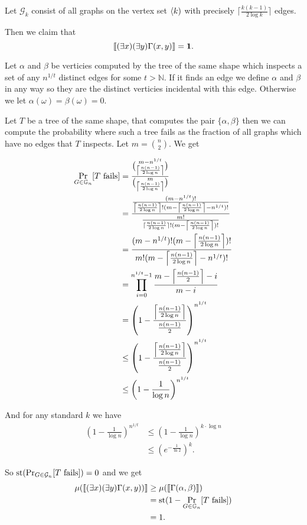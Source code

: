 \begin{exam}
Let $\mathcal{G}_k$ consist of all graphs on the vertex set $\langle k)$ with precisely $\lceil\frac{k(k-1)}{2\log k}\rceil$ edges.

Then we claim that
\[\llbracket(\exists x)(\exists y)\Gamma(x,y)\rrbracket=\textbf{1}.\]

Let $\alpha$ and $\beta$ be verticies computed by the tree of the same shape which inspects a set of any $n^{1/t}$ distinct edges for some $t>\mathbb{N}$. If it finds an edge we define $\alpha$ and $\beta$ in any way so they are the distinct verticies incidental with this edge. Otherwise we let $\alpha(\omega)=\beta(\omega)=0$.

Let $T$ be a tree of the same shape, that computes the pair $\{\alpha,\beta\}$ then we can compute the probability where such a tree fails as the fraction of all graphs which have no edges that $T$ inspects. Let $m=\binom{n}{2}$. We get

\begin{align}
\Pr_{G\in\mathbb{G}_n}[T\text{ fails}]&=\frac{\binom{m-n^{1/t}}{\left \lceil { \frac{n(n-1)}{2\log n}} \right \rceil }}{\binom{m}{\left \lceil { \frac{n(n-1)}{2\log n}} \right \rceil}}\\
&=\frac{\frac{(m-n^{1/t})!}{\left \lceil {\frac{n(n-1)}{2\log n}} \right \rceil ! (m-\left \lceil { \frac{n(n-1)}{2\log n}} \right \rceil-n^{1/t})!}}{\frac{m!}{\lceil \frac{n(n-1)}{2\log n}\rceil!(m-\left \lceil {\frac{n(n-1)}{2\log n}} \right \rceil)!}}\\
&=\frac{(m-n^{1/t})!(m-\left \lceil { \frac{n(n-1)}{2\log n}} \right \rceil)!}{m!(m-\left \lceil {\frac{n(n-1)}{2\log n}} \right \rceil-n^{1/t})!}\\
&=\prod_{i=0}^{n^{1/t}-1}\frac{m-\left \lceil {\frac{n(n-1)}{2}} \right \rceil-i}{m-i}\\
&=\left(1-\frac{\left \lceil {\frac{n(n-1)}{2\log n}} \right \rceil}{\frac{n(n-1)}{2}}\right)^{n^{1/t}}\\
&\leq\left(1-\frac{\left \lceil {\frac{n(n-1)}{2\log n}} \right \rceil}{\frac{n(n-1)}{2}}\right)^{n^{1/t}}\\
&\leq\left(1-\frac{1}{\log n}\right)^{n^{1/t}}
\end{align}

And for any standard $k$ we have
\begin{align}
\left(1-\frac{1}{\log n}\right)^{n^{1/t}}&\leq\left(1-\frac{1}{\log n}\right)^{k\cdot \log n}\\
&\leq (e^{-\frac{1}{\ln 2}})^k.
\end{align}

So $\text{st}(\Pr_{G\in\mathcal{G}_n}[T\text{ fails}])=0$ and we get 
\begin{align}
\mu(\llbracket(\exists x)(\exists y)\Gamma(x,y)) \rrbracket &\geq \mu(\llbracket \Gamma(\alpha,\beta)\rrbracket)\\
&=\text{st}(1-\Pr_{G\in\mathbb{G}_n}[T\text{ fails}])\\
&=1.
\end{align}
\end{exam}


